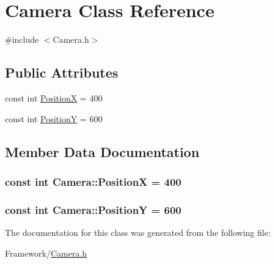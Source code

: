 \hypertarget{classCamera}{}\section{Camera Class Reference}
\label{classCamera}


{\ttfamily \#include $<$Camera.\+h$>$}

\subsection*{Public Attributes}
\begin{DoxyCompactItemize}
\item 
const int \hyperlink{classCamera_a03c4dcf6dd5c9c3c9fbc37c11fab1544}{PositionX} = 400
\item 
const int \hyperlink{classCamera_aa0ad05ea7786e7e33d50244c15ebc441}{PositionY} = 600
\end{DoxyCompactItemize}


\subsection{Member Data Documentation}
\subsubsection[{\texorpdfstring{PositionX}{PositionX}}]{\setlength{\rightskip}{0pt plus 5cm}const int Camera\+::\+PositionX = 400}\hypertarget{classCamera_a03c4dcf6dd5c9c3c9fbc37c11fab1544}{}\label{classCamera_a03c4dcf6dd5c9c3c9fbc37c11fab1544}
\subsubsection[{\texorpdfstring{PositionY}{PositionY}}]{\setlength{\rightskip}{0pt plus 5cm}const int Camera\+::\+PositionY = 600}\hypertarget{classCamera_aa0ad05ea7786e7e33d50244c15ebc441}{}\label{classCamera_aa0ad05ea7786e7e33d50244c15ebc441}


The documentation for this class was generated from the following file\+:\begin{DoxyCompactItemize}
\item 
Framework/\hyperlink{Camera_8h}{Camera.\+h}\end{DoxyCompactItemize}
